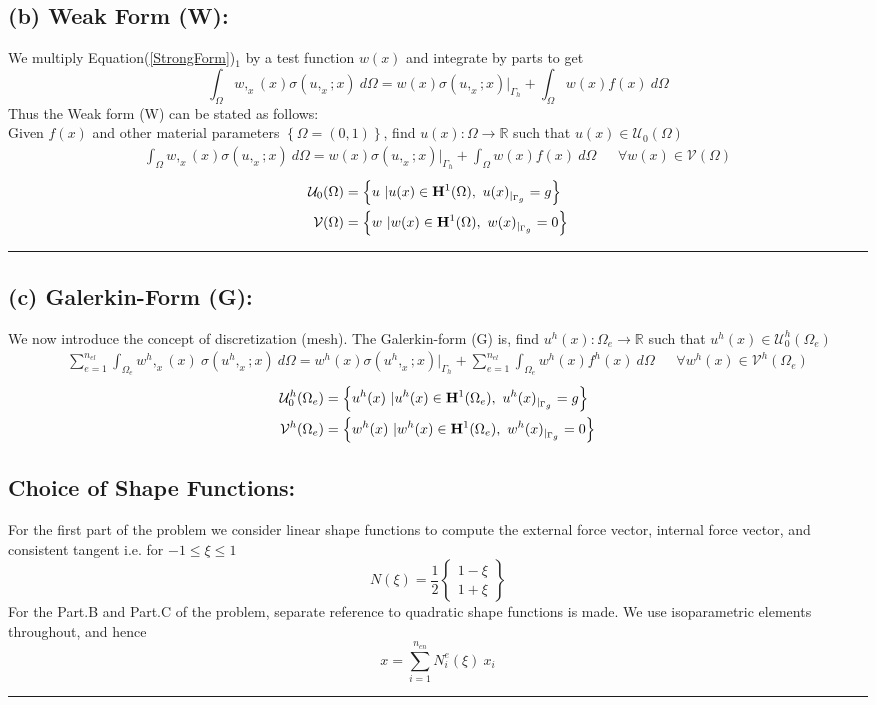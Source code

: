 \documentclass[11pt]{article}
\begin{document}
\subsection*{(b) Weak Form (W):}
We multiply Equation(\ref{StrongForm})$_1$ by a test function $w(x)$ and integrate by parts to get 
\[
\int_{\Omega} w,_{x}(x) \sigma\left(u,_{x}; x \right)\ d\Omega =  w(x)\sigma\left(u,_{x}; x \right) |_{\Gamma_h} + \int_{\Omega} w(x) f(x)\ d\Omega
\]
Thus the Weak form (W) can be stated as follows: \\ \noindent Given $f(x)$ and other material parameters $\left\{\Omega = (0,1)\right\}$, find $u(x): \Omega \rightarrow \mathbb{R}$ such that $u(x) \in \mathcal{U}_0 (\Omega)$
\begin{align}
\int_{\Omega} w,_{x}(x) \sigma\left(u,_{x}; x \right)\ d\Omega =  w(x)\sigma\left(u,_{x}; x \right) |_{\Gamma_h} + \int_{\Omega} w(x) f(x)\ d\Omega \ \ \ \ \ \ \ \forall w(x) \in \mathcal{V}(\Omega)
\end{align}
\begin{align*}
\mathcal{U}_0(\Omega) &= \left\{ u\ | u(x) \in {\bf{H}}^1 (\Omega),\ u(x)_{|_{\Gamma_g}} = g\right\}\\
\mathcal{V}(\Omega) & = \left\{ w\ | w(x) \in {\bf{H}}^1 (\Omega),\ w(x)_{|_{\Gamma_g}} = 0\right\}
\end{align*} \hrule
\subsection*{(c) Galerkin-Form (G):}
We now introduce the concept of discretization (mesh). The Galerkin-form (G) is, find $u^h(x): \Omega_e \rightarrow \mathbb{R}$ such that $u^h(x) \in \mathcal{U}^h_0 (\Omega_e)$
\begin{align}
\sum_{e=1}^{n_{el}}\int_{\Omega_e} w^h,_{x}(x)\ \sigma\left(u^h,_{x}; x \right)\ d\Omega =  w^h(x)\sigma\left(u^h,_{x}; x \right) |_{\Gamma_h} + \sum_{e=1}^{n_{el}}\int_{\Omega_e} w^h(x) f^h(x)\ d\Omega \ \ \ \ \ \ \ \forall w^h(x) \in \mathcal{V}^h(\Omega_e)
\end{align} 
\begin{align*}
\mathcal{U}^h_0(\Omega_e) &= \left\{ u^h (x)\ | u^h(x) \in {\bf{H}}^1 (\Omega_e),\ u^h(x)_{|_{\Gamma_g}} = g\right\}\\
\mathcal{V}^h(\Omega_e) & = \left\{ w^h(x)\ | w^h(x) \in {\bf{H}}^1 (\Omega_e),\ w^h(x)_{|_{\Gamma_g}} = 0\right\}
\end{align*}
\subsection*{Choice of Shape Functions:}
For the first part of the problem we consider linear shape functions to compute the external force vector, internal force vector, and consistent tangent i.e. for $-1\leq\xi\leq 1$
\[
N(\xi) 
=\frac{1}{2}
\begin{Bmatrix}
{1-\xi} \\
{1+\xi}
\end{Bmatrix}
\]
For the Part.B and Part.C of the problem, separate reference to quadratic shape functions is made. We use isoparametric elements throughout, and hence \[
{x} = \sum_{i=1}^{n_{en}} N^e_i (\xi) \ x_i
\]  \hrule
\end{document}
